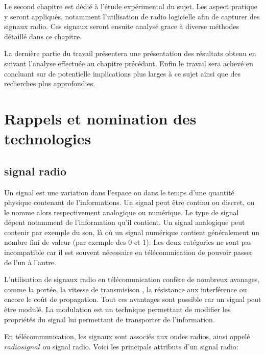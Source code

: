 \documentclass[12pt,a4paper,oneside, titlepage]{report}
\begin{document}
Le second chapitre est dédié à l'étude expérimental du sujet. Les aspect pratique y seront appliqués, notamment l'utilisation de radio logicielle afin de capturer des signaux radio. Ces signaux seront ensuite analysé grace à diverse méthodes détaillé dans ce chapitre.

La dernière partie du travail présentera une présentation des résultats obtenu en suivant l'analyse effectuée au chapitre précédant. Enfin le travail sera achevé en concluant sur de potentielle implications plus larges à ce sujet ainsi que des recherches plus approfondies.

\chapter{Rappels et nomination des technologies}

\section{signal radio}

Un signal est une variation dans l'espace ou dans le temps d'une quantité physique contenant de l'informations. Un signal peut être continu ou discret, on le nomme alors respectivement analogique ou numérique. Le type de signal dépent notamment de l'information qu'il contient. Un signal analogique peut contenir par exemple du son, là où un signal numérique contient généralement un nombre fini de valeur (par exemple des 0 et 1).
Les deux catégories ne sont pas incompatible car il est souvent nécessaire en télécommication de pouvoir passer de l'un à l'autre.

L'utilisation de signaux radio en télécomunication confère de nombreux avanages, comme la portée, la vitesse de transmisison , la résistance aux interférence ou encore le coût de propagation. Tout ces avantages sont possible car un signal peut être modulé. La modulation est un technique permettant de modifier les propriétés du signal lui permettant de transporter de l'information.

En télécommunication, les signaux sont associés aux ondes radios, ainsi appelé $radio signal$ ou signal radio. Voici les principals attributs d'un signal radio: 
\end{document}
